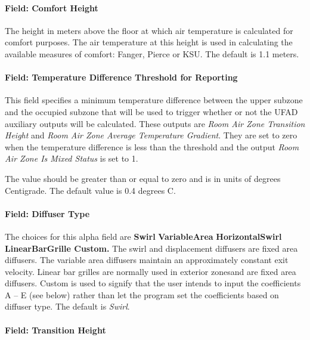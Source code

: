 \paragraph{Field: Comfort Height}\label{field-comfort-height-1}

The height in meters above the floor at which air temperature is calculated for comfort purposes. The air temperature at this height is used in calculating the available measures of comfort: Fanger, Pierce or KSU. The default is 1.1 meters.

\paragraph{Field: Temperature Difference Threshold for Reporting}\label{field-temperature-difference-threshold-for-reporting-1}

This field specifies a minimum temperature difference between the upper subzone and the occupied subzone that will be used to trigger whether or not the UFAD auxiliary outputs will be calculated. These outputs are \emph{Room Air Zone Transition Height} and \emph{Room Air Zone Average Temperature Gradient}. They are set to zero when the temperature difference is less than the threshold and the output \emph{Room Air Zone Is Mixed Status} is set to 1.

The value should be greater than or equal to zero and is in units of degrees Centigrade. The default value is 0.4 degrees C.

\paragraph{Field: Diffuser Type}\label{field-diffuser-type}

The choices for this alpha field are \textbf{Swirl} \textbar{} \textbf{VariableArea} \textbar{} \textbf{HorizontalSwirl \textbar{} LinearBarGrille \textbar{} Custom.} The swirl and displacement diffusers are fixed area diffusers. The variable area diffusers maintain an approximately constant exit velocity. Linear bar grilles are normally used in exterior zonesand are fixed area diffusers. Custom is used to signify that the user intends to input the coefficients A -- E (see below) rather than let the program set the coefficients based on diffuser type. The default is \emph{Swirl}.

\paragraph{Field: Transition Height}\label{field-transition-height}

